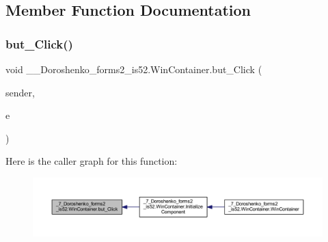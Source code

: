 \subsection{Member Function Documentation}
\hypertarget{class__7___doroshenko__forms2__is52_1_1_win_container_a217dc01fee62dcfef24c4345900b86c7}{}\label{class__7___doroshenko__forms2__is52_1_1_win_container_a217dc01fee62dcfef24c4345900b86c7} 
\subsubsection{\texorpdfstring{but\+\_\+\+Click()}{but\_Click()}}
{\footnotesize\ttfamily void \+\_\+\_\+\+Doroshenko\+\_\+forms2\+\_\+is52.\+Win\+Container.\+but\+\_\+\+Click (\begin{DoxyParamCaption}\item[{object}]{sender,  }\item[{Event\+Args}]{e }\end{DoxyParamCaption})\hspace{0.3cm}{\ttfamily [private]}}

Here is the caller graph for this function\+:
\nopagebreak
\begin{figure}[H]
\begin{center}
\leavevmode
\includegraphics[width=350pt]{class__7___doroshenko__forms2__is52_1_1_win_container_a217dc01fee62dcfef24c4345900b86c7_icgraph}
\end{center}
\end{figure}
\hypertarget{class__7___doroshenko__forms2__is52_1_1_win_container_a6afaa8f33f51c512b4ef25f24f2cba7a}{}\label{class__7___doroshenko__forms2__is52_1_1_win_container_a6afaa8f33f51c512b4ef25f24f2cba7a} 
